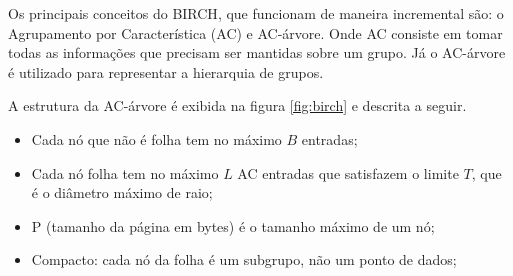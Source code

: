 Os principais conceitos do \acrshort{BIRCH}, que funcionam de maneira incremental são: o Agrupamento por Característica (AC) e AC-árvore. Onde AC consiste em tomar todas as informações que precisam ser mantidas sobre um grupo. Já o AC-árvore é utilizado para representar a hierarquia de grupos.

A estrutura da AC-árvore é exibida na figura \ref{fig:birch} e descrita a seguir.

\begin{itemize}
    \item Cada nó que não é folha tem no máximo ${B}$ entradas;
    \item Cada nó folha tem no máximo ${L}$ AC entradas que satisfazem o limite ${T}$, que é o diâmetro máximo de raio;
    \item P (tamanho da página em bytes) é o tamanho máximo de um nó;
    \item Compacto: cada nó da folha é um subgrupo, não um ponto de dados;
\end{itemize}

\begin{figure}[!ht]
	\centering
\end{figure}

